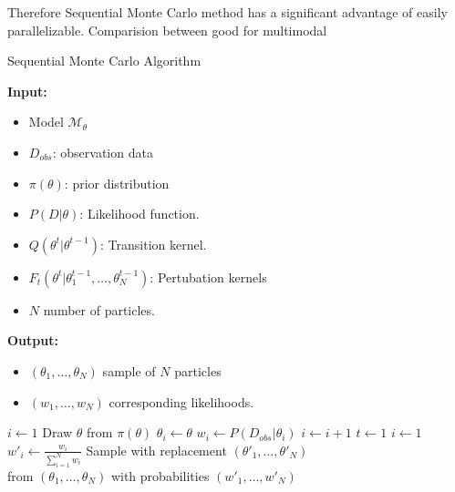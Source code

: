 Therefore Sequential Monte Carlo method has a significant advantage of easily
parallelizable. Comparision between \cite{daviet2018inference}
good for multimodal
\begin{algorithm}[H]
      \caption{Sequential Monte Carlo Algorithm}
      \label{alg:smc}
      \footnotesize{
            \hspace*{\algorithmicindent} \textbf{Input:}
            \begin{itemize}
                  \item Model $\mathcal{M}_\theta$
                  \item $D_{obs}$: observation data
                  \item $\pi(\theta)$: prior distribution
                  \item $P(D|\theta)$: Likelihood function.
                  \item $Q(\theta^t|\theta^{t-1})$: Transition kernel.
                  \item $F_t(\theta^t|\theta_1^{t-1},\ldots,\theta_N^{t-1})$: Pertubation kernels
                  \item $N$ number of particles.
            \end{itemize}
            \hspace*{\algorithmicindent} \textbf{Output:}
            \begin{itemize}
                  \item $(\theta_1,\ldots,\theta_N)$ sample of $N$ particles
                  \item $(w_1,\ldots,w_N)$ corresponding likelihoods.
            \end{itemize}
      }
      \begin{algorithmic}[1]
            \State $i \leftarrow 1$
             
            \State Draw $\theta$ from $\pi(\theta)$
            \State $\theta_i \leftarrow \theta$
            \State $w_i \leftarrow P(D_{obs}|\theta_i)$
            \State $i \leftarrow i + 1$
            \EndWhile
            \State $t \leftarrow 1$
            \State $i \leftarrow 1$ 
            \State $w'_i \leftarrow \frac{w_i}{\sum_{i=1}^N w_i} $
            \EndWhile
            \State Sample with replacement $(\theta'_1,\ldots,\theta'_N)$  \\\hspace{1.5cm} from $(\theta_1,\ldots,\theta_N)$ with probabilities $(w'_1,\ldots,w'_N)$

\end{algorithmic}
\end{algorithm}
